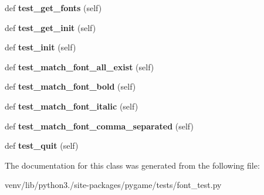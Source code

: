 \begin{DoxyCompactItemize}
def {\bfseries test\+\_\+get\+\_\+fonts} (self)
\item 
\mbox{\label{classpygame_1_1tests_1_1font__test_1_1_font_module_test_a0f20ce89cc535a64755b13e25bd2f863}} 
def {\bfseries test\+\_\+get\+\_\+init} (self)
\item 
\mbox{\label{classpygame_1_1tests_1_1font__test_1_1_font_module_test_a4ec40337d5888b398cb3337be87a0051}} 
def {\bfseries test\+\_\+init} (self)
\item 
\mbox{\label{classpygame_1_1tests_1_1font__test_1_1_font_module_test_a6d32390bdd394f434eab2b83dee04470}} 
def {\bfseries test\+\_\+match\+\_\+font\+\_\+all\+\_\+exist} (self)
\item 
\mbox{\label{classpygame_1_1tests_1_1font__test_1_1_font_module_test_a72c64c9edf7fdf9f7307476c0fc276ee}} 
def {\bfseries test\+\_\+match\+\_\+font\+\_\+bold} (self)
\item 
\mbox{\label{classpygame_1_1tests_1_1font__test_1_1_font_module_test_a9e1907e57b8e899577bffcd8b703c512}} 
def {\bfseries test\+\_\+match\+\_\+font\+\_\+italic} (self)
\item 
\mbox{\label{classpygame_1_1tests_1_1font__test_1_1_font_module_test_a0871ba3a752feae092251fa5031eb5d5}} 
def {\bfseries test\+\_\+match\+\_\+font\+\_\+comma\+\_\+separated} (self)
\item 
\mbox{\label{classpygame_1_1tests_1_1font__test_1_1_font_module_test_a0090b9c08b96544c0ea5bd77404b7a12}} 
def {\bfseries test\+\_\+quit} (self)
\end{DoxyCompactItemize}


The documentation for this class was generated from the following file\+:\begin{DoxyCompactItemize}
\item 
venv/lib/python3./site-\/packages/pygame/tests/font\+\_\+test.\+py\end{DoxyCompactItemize}
